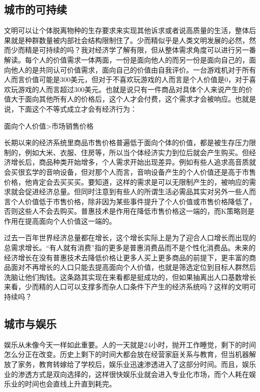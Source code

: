 \documentclass[
]{book}
\begin{document}
\hypertarget{ux57ceux5e02ux7684ux53efux6301ux7eed}{%
\subsection{城市的可持续}\label{ux57ceux5e02ux7684ux53efux6301ux7eed}}

文明可以让个体脱离物种的生存要求来实现其他诉求或者说高质量的生活，整体后果就是种群数量被内部社会结构限制住了。少而精似乎是人类文明发展的必然，然而少而精是可持续的吗？我对经济学了解有限，但从整体需求角度可以进行另一番解读。每个人的价值需求一体两面，一份是面向他人的而另一份是面向自己的，面向他人的是共同认可价值需求，面向自己的价值由自我评价。一台游戏机对于所有人而言价值可能是300美元，但对于不喜欢玩游戏的人而言是个人价值是0，对于喜欢玩游戏的人而言超过300美元。也就是说只有一件商品对具体个人来说产生的价值大于面向其他所有人的价格后，这个人才会付费，这个需求才会被响应。也就是说，下面这个不等式成立才会有经济行为：

面向个人价值\textgreater 市场销售价格

长期以来的经济系统里商品市售价格普遍低于面向个体的价值，都是被生存压力限制的，例如大米、衣服、住房等，所以当个体经济实力到位后就会产生购买。但经济增长后，商品种类开始增多，个人需求开始出现差异。例如有些人追求高音质就会买很玄学的音响设备，但对那个人而言，音响设备产生的个人价值还是高于市售价格，他肯定会去买买买。要知道，这样的需求是可以无限制产生的，被响应的需求就会促进经济总量。但同时注意到有些人的所谓生活必需品其实对另外一些人而言个人价值低于市售价格，除非因为某些事件提升了个人价值或市售价格降低了，否则这些人不会去购买。普惠技术是作用在降低市售价格这一端的，而K策略则是作用在提高面向个人价值这一端的。

过去一百年世界经济总量都在增长，这个增长实际上是为了迎合人口增长而出现的总需求增长。``有人就有消费''指的更多是普惠消费品而不是个性化消费品。未来的经济增长在没有普惠技术去降低价格让更多人买上更多商品的前提下，更丰富的商品面对不再增长的人口只能去提高面向个人价值，也就是筛选定位到目标人群然后洗脑让他们掏钱。这条路其实现在来看都是挺成功的，但如果抽离出人口基数增长来看，少而精的人口可以支撑多而杂人口条件下产生的经济系统吗？这样的文明可持续吗？

\hypertarget{ux57ceux5e02ux4e0eux5a31ux4e50}{%
\subsection{城市与娱乐}\label{ux57ceux5e02ux4e0eux5a31ux4e50}}

娱乐从未像今天一样如此重要。人的一天就是24小时，抛开工作睡觉，剩下的时间怎么分正在改变。历史上剩下的时间大都会放在经营家庭关系与教育，但当机器解放了家务，教育转嫁给了学校后，娱乐业迅速渗透进入了这部分时间。而且，娱乐业的渗透方式是双向选择的，这样很快娱乐业就会进入专业化市场，而个人耗在娱乐业的时间也会直线上升直到耗完。
\end{document}
